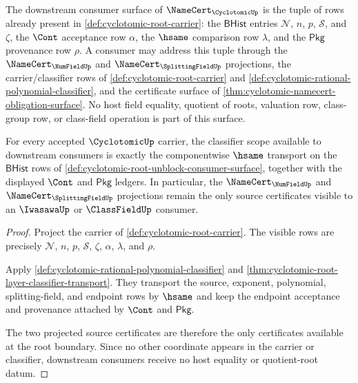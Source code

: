 \begin{definition}
\label{def:cyclotomic-root-unblock-consumer-surface}
The downstream consumer surface of $\NameCert_{\CyclotomicUp}$ is the tuple of
rows already present in \autoref{def:cyclotomic-root-carrier}: the
$\mathsf{BHist}$ entries $\mathcal{N}$, $n$, $p$, $\mathcal{S}$, and $\zeta$,
the $\Cont$ acceptance row $\alpha$, the $\hsame$ comparison row $\lambda$, and
the $\mathsf{Pkg}$ provenance row $\rho$.  A consumer may address this tuple
through the $\NameCert_{\NumFieldUp}$ and $\NameCert_{\SplittingFieldUp}$
projections, the carrier/classifier rows of \autoref{def:cyclotomic-root-carrier}
and \autoref{def:cyclotomic-rational-polynomial-classifier}, and the certificate
surface of \autoref{thm:cyclotomic-namecert-obligation-surface}.  No host
field equality, quotient of roots, valuation row, class-group row, or
class-field operation is part of this surface.
\end{definition}

\begin{theorem}
\label{thm:cyclotomic-root-carrier-classifier-scope}
For every accepted $\CyclotomicUp$ carrier, the classifier scope available to
downstream consumers is exactly the componentwise $\hsame$ transport on the
$\mathsf{BHist}$ rows of \autoref{def:cyclotomic-root-unblock-consumer-surface},
together with the displayed $\Cont$ and $\mathsf{Pkg}$ ledgers.  In particular,
the $\NameCert_{\NumFieldUp}$ and $\NameCert_{\SplittingFieldUp}$ projections
remain the only source certificates visible to an $\IwasawaUp$ or
$\ClassFieldUp$ consumer.
\end{theorem}
\begin{proof}
Project the carrier of \autoref{def:cyclotomic-root-carrier}.  The visible
rows are precisely $\mathcal{N}$, $n$, $p$, $\mathcal{S}$, $\zeta$, $\alpha$,
$\lambda$, and $\rho$.

Apply \autoref{def:cyclotomic-rational-polynomial-classifier} and
\autoref{thm:cyclotomic-root-layer-classifier-transport}.  They transport the
source, exponent, polynomial, splitting-field, and endpoint rows by $\hsame$
and keep the endpoint acceptance and provenance attached by $\Cont$ and
$\mathsf{Pkg}$.

The two projected source certificates are therefore the only certificates
available at the root boundary.  Since no other coordinate appears in the
carrier or classifier, downstream consumers receive no host equality or
quotient-root datum.
\end{proof}

